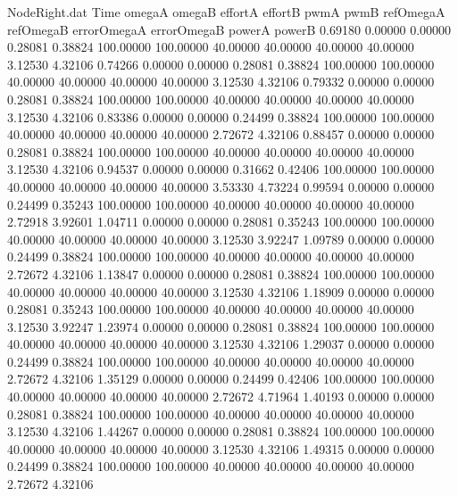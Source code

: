 \begin{filecontents}{NodeRight.dat}
Time omegaA omegaB effortA effortB pwmA pwmB refOmegaA refOmegaB errorOmegaA errorOmegaB powerA powerB
   0.69180    0.00000    0.00000     0.28081    0.38824  100.00000  100.00000   40.00000   40.00000   40.00000   40.00000    3.12530    4.32106
   0.74266    0.00000    0.00000     0.28081    0.38824  100.00000  100.00000   40.00000   40.00000   40.00000   40.00000    3.12530    4.32106
   0.79332    0.00000    0.00000     0.28081    0.38824  100.00000  100.00000   40.00000   40.00000   40.00000   40.00000    3.12530    4.32106
   0.83386    0.00000    0.00000     0.24499    0.38824  100.00000  100.00000   40.00000   40.00000   40.00000   40.00000    2.72672    4.32106
   0.88457    0.00000    0.00000     0.28081    0.38824  100.00000  100.00000   40.00000   40.00000   40.00000   40.00000    3.12530    4.32106
   0.94537    0.00000    0.00000     0.31662    0.42406  100.00000  100.00000   40.00000   40.00000   40.00000   40.00000    3.53330    4.73224
   0.99594    0.00000    0.00000     0.24499    0.35243  100.00000  100.00000   40.00000   40.00000   40.00000   40.00000    2.72918    3.92601
   1.04711    0.00000    0.00000     0.28081    0.35243  100.00000  100.00000   40.00000   40.00000   40.00000   40.00000    3.12530    3.92247
   1.09789    0.00000    0.00000     0.24499    0.38824  100.00000  100.00000   40.00000   40.00000   40.00000   40.00000    2.72672    4.32106
   1.13847    0.00000    0.00000     0.28081    0.38824  100.00000  100.00000   40.00000   40.00000   40.00000   40.00000    3.12530    4.32106
   1.18909    0.00000    0.00000     0.28081    0.35243  100.00000  100.00000   40.00000   40.00000   40.00000   40.00000    3.12530    3.92247
   1.23974    0.00000    0.00000     0.28081    0.38824  100.00000  100.00000   40.00000   40.00000   40.00000   40.00000    3.12530    4.32106
   1.29037    0.00000    0.00000     0.24499    0.38824  100.00000  100.00000   40.00000   40.00000   40.00000   40.00000    2.72672    4.32106
   1.35129    0.00000    0.00000     0.24499    0.42406  100.00000  100.00000   40.00000   40.00000   40.00000   40.00000    2.72672    4.71964
   1.40193    0.00000    0.00000     0.28081    0.38824  100.00000  100.00000   40.00000   40.00000   40.00000   40.00000    3.12530    4.32106
   1.44267    0.00000    0.00000     0.28081    0.38824  100.00000  100.00000   40.00000   40.00000   40.00000   40.00000    3.12530    4.32106
   1.49315    0.00000    0.00000     0.24499    0.38824  100.00000  100.00000   40.00000   40.00000   40.00000   40.00000    2.72672    4.32106

\end{filecontents}
